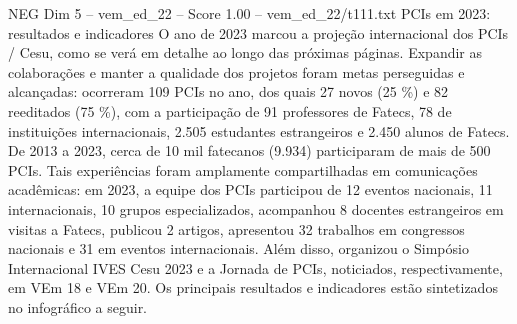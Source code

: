 \begin{textsample}{NEG Dim 5 – vem\_ed\_22 – Score 1.00 – vem\_ed\_22/t111.txt}  \label{ex:f5_neg_082}
PCIs em 2023: resultados e indicadores O ano de 2023 marcou a projeção internacional dos PCIs / Cesu, como se verá em detalhe ao longo das próximas páginas.
Expandir as colaborações e manter a qualidade dos projetos foram metas perseguidas e alcançadas: ocorreram 109 PCIs no ano, dos quais 27 novos (25 \%) e 82 reeditados (75 \%), com a participação de 91 professores de Fatecs, 78 de instituições internacionais, 2.505 estudantes estrangeiros e 2.450 alunos de Fatecs.
De 2013 a 2023, cerca de 10 mil fatecanos (9.934) participaram de mais de 500 PCIs.
Tais experiências foram amplamente compartilhadas em comunicações acadêmicas: em 2023, a equipe dos PCIs participou de 12 eventos nacionais, 11 internacionais, 10 grupos especializados, acompanhou 8 docentes estrangeiros em visitas a Fatecs, publicou 2 artigos, apresentou 32 trabalhos em congressos nacionais e 31 em eventos internacionais.
Além disso, organizou o Simpósio Internacional IVES Cesu 2023 e a Jornada de PCIs, noticiados, respectivamente, em VEm 18 e VEm 20.
Os principais resultados e indicadores estão sintetizados no infográfico a seguir.

\end{textsample}

